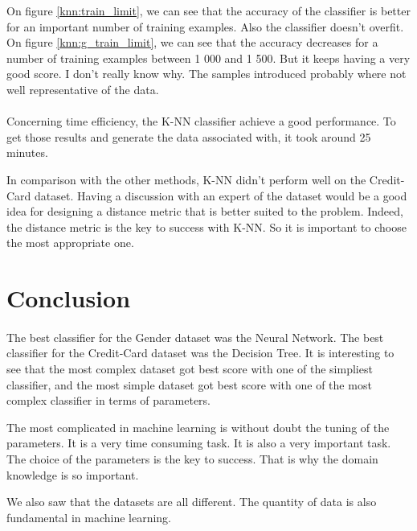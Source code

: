 \documentclass[10pt]{article}
\begin{document}
			On figure \ref{knn:train_limit}, we can see that the accuracy of the classifier is better for an important number of training examples. Also the classifier doesn't overfit. On figure \ref{knn:g_train_limit}, we can see that the accuracy decreases for a number of training examples between 1 000 and 1 500. But it keeps having a very good score. I don't really know why. The samples introduced probably where not well representative of the data.

		\paragraph*{}
			Concerning time efficiency, the K-NN classifier achieve a good performance. To get those results and generate the data associated with, it took around 25 minutes.

			In comparison with the other methods, K-NN didn't  perform well on the Credit-Card dataset. Having a discussion with an expert of the dataset would be a good idea for designing a distance metric that is better suited to the problem. Indeed, the distance metric is the key to success with K-NN. So it is important to choose the most appropriate one.
	\section{Conclusion}
		\paragraph*{}
			The best classifier for the Gender dataset was the Neural Network. The best classifier for the Credit-Card dataset was the Decision Tree. It is interesting to see that the most complex dataset got best score with one of the simpliest classifier, and the most simple dataset got best score with one of the most complex classifier in terms of parameters.

			The most complicated in machine learning is without doubt the tuning of the parameters. It is a very time consuming task. It is also a very important task. The choice of the parameters is the key to success. That is why the domain knowledge is so important.

			We also saw that the datasets are all different. The quantity of data is also fundamental in machine learning.
\end{document}
